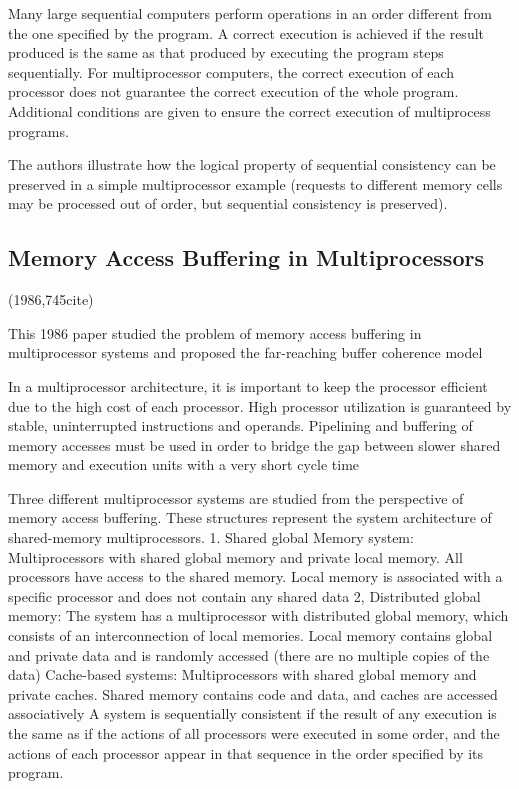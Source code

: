 \documentclass[a4paper,twoside]{scrbook}
\begin{document}
Many large sequential computers perform operations in an order different from the one specified by the program. A correct execution is achieved if the result produced is the same as that produced by executing the program steps sequentially. For multiprocessor computers, the correct execution of each processor does not guarantee the correct execution of the whole program. Additional conditions are given to ensure the correct execution of multiprocess programs.

The authors illustrate how the logical property of sequential consistency can be preserved in a simple multiprocessor example (requests to different memory cells may be processed out of order, but sequential consistency is preserved).
\subsection{Memory Access Buffering in Multiprocessors\cite{dubois1986memory}}
(1986,745cite)\par
This 1986 paper studied the problem of memory access buffering in multiprocessor systems and proposed the far-reaching buffer coherence model
\par
In a multiprocessor architecture, it is important to keep the processor efficient due to the high cost of each processor. High processor utilization is guaranteed by stable, uninterrupted instructions and operands. Pipelining and buffering of memory accesses must be used in order to bridge the gap between slower shared memory and execution units with a very short cycle time
\par
Three different multiprocessor systems are studied from the perspective of memory access buffering. These structures represent the system architecture of shared-memory multiprocessors.
1. Shared global Memory system: Multiprocessors with shared global memory and private local memory. All processors have access to the shared memory. Local memory is associated with a specific processor and does not contain any shared data
2, Distributed global memory: The system has a multiprocessor with distributed global memory, which consists of an interconnection of local memories. Local memory contains global and private data and is randomly accessed (there are no multiple copies of the data)
Cache-based systems: Multiprocessors with shared global memory and private caches. Shared memory contains code and data, and caches are accessed associatively
A system is sequentially consistent if the result of any execution is the same as if the actions of all processors were executed in some order, and the actions of each processor appear in that sequence in the order specified by its program.
\end{document}
